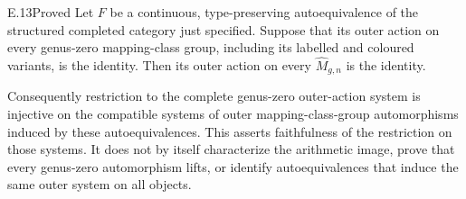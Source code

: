 \begin{claim}{E.13}{Proved}
Let $F$ be a continuous, type-preserving autoequivalence of the structured
completed category just specified. Suppose that its outer action on every
genus-zero mapping-class group, including its labelled and coloured
variants, is the identity. Then its outer action on every
$\widehat M_{g,n}$ is the identity.

Consequently restriction to the complete genus-zero outer-action system
is injective on the compatible systems of outer mapping-class-group
automorphisms induced by these autoequivalences. This asserts faithfulness
of the restriction on those systems. It does not by itself characterize
the arithmetic image, prove that every genus-zero automorphism lifts,
or identify autoequivalences that induce the same outer system on all
objects.
\end{claim}
